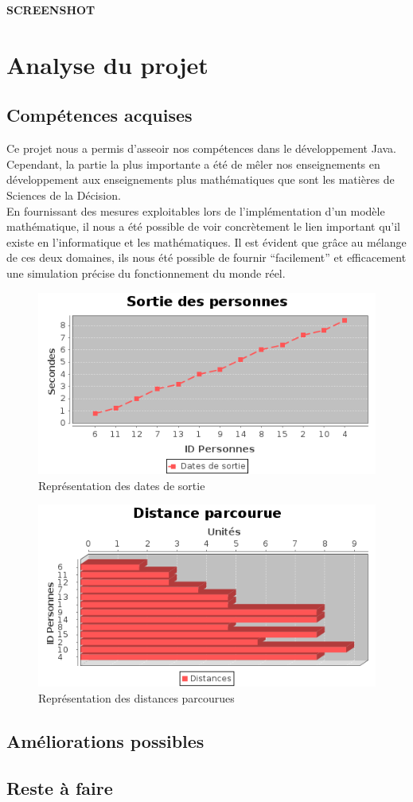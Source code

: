 \documentclass[twoside,UTF8]{EPURapport}
\begin{document}
	\textbf{SCREENSHOT}
		
\chapter{Analyse du projet}
	\section{Compétences acquises}
	Ce projet nous a permis d'asseoir nos compétences dans le développement Java. Cependant, la partie la plus importante a été de mêler nos enseignements en développement aux enseignements plus mathématiques que sont les matières de Sciences de la Décision.\\
	
	En fournissant des mesures exploitables lors de l'implémentation d'un modèle mathématique, il nous a été possible de voir concrètement le lien important qu'il existe en l'informatique et les mathématiques. Il est évident que grâce au mélange de ces deux domaines, ils nous été possible de fournir ``facilement'' et efficacement une simulation précise du fonctionnement du monde réel.
	
	\begin{figure}[!H]
	\centering
	\includegraphics[scale=0.7]{imagesPNG/dateSortie.png}
	\caption{Représentation des dates de sortie}
	\label{fig:date_sortie}
	\end{figure}
	
	\begin{figure}[!H]
	\centering
	\includegraphics[scale=0.7]{imagesPNG/distanceParcourue.png}
	\caption{Représentation des distances parcourues}
	\label{fig:distances_parcourues}
	\end{figure}
	
	\section{Améliorations possibles}

	\section{Reste à faire}
	
\annexes
\end{document}

